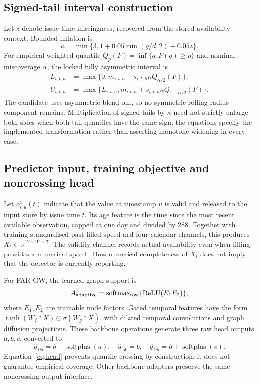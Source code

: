 \subsection{Signed-tail interval construction}
Let $z$ denote issue-time missingness, recovered from the stored availability context. Bounded inflation is
\begin{equation}
\kappa=\min\{3,1+0.05\min(g/d,2)+0.05z\}.
\end{equation}
For empirical weighted quantile $Q_p(F)=\inf\{q:F(q)\ge p\}$ and nominal miscoverage $\alpha$, the locked fully asymmetric interval is
\begin{align}
L_{i,t,h}&=\max\{0,m_{i,t,h}+s_{i,t,h}\kappa Q_{\alpha/2}(F)\},\\
U_{i,t,h}&=\max\{L_{i,t,h},m_{i,t,h}+s_{i,t,h}\kappa Q_{1-\alpha/2}(F)\}.
\label{eq:interval}
\end{align}
The candidate uses asymmetric blend one, so no symmetric rolling-radius component remains. Multiplication of signed tails by $\kappa$ need not strictly enlarge both sides when both tail quantiles have the same sign; the equations specify the implemented transformation rather than asserting monotone widening in every case.


\subsection{Predictor input, training objective and noncrossing head}
Let $o^x_{i,u}(t)$ indicate that the value at timestamp $u$ is valid and released to the input store by issue time $t$. Its age feature is the time since the most recent available observation, capped at one day and divided by 288. Together with training-standardised past-filled speed and four calendar channels, this produces $X_t\in\mathbb R^{12\times |V|\times7}$. The validity channel records actual availability even when filling provides a numerical speed. Thus numerical completeness of $X_t$ does not imply that the detector is currently reporting.

For FAR-GW, the learned graph support is
\begin{equation}
A_{\rm adaptive}=\operatorname{softmax}_{\rm row}\{\operatorname{ReLU}(E_1E_2)\},
\end{equation}
where $E_1,E_2$ are trainable node factors. Gated temporal features have the form $\tanh(W_f*X)\odot\sigma(W_g*X)$, with dilated temporal convolutions and graph diffusion projections. These backbone operations generate three raw head outputs $a,b,c$, converted to
\begin{equation}
\widehat q_{.05}=b-\operatorname{softplus}(a),\quad
\widehat q_{.50}=b,\quad
\widehat q_{.95}=b+\operatorname{softplus}(c).
\label{eq:head}
\end{equation}
Equation~\eqref{eq:head} prevents quantile crossing by construction; it does not guarantee empirical coverage. Other backbone adapters preserve the same noncrossing output interface.

